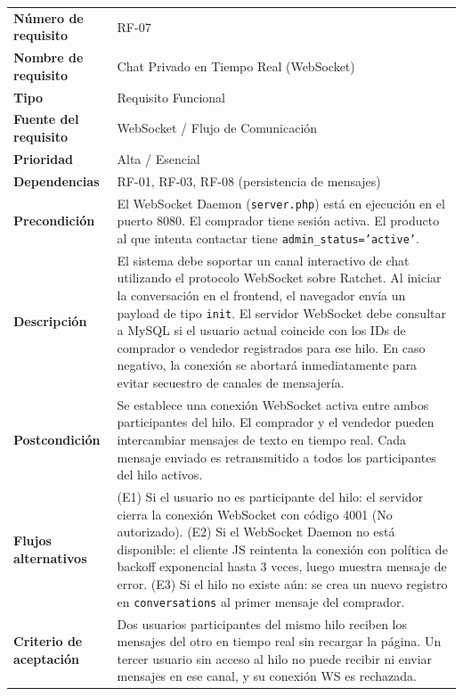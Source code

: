 \documentclass[11pt,a4paper]{report}
\begin{document}
\begin{table}[H]
\centering
\begin{tabularx}{\textwidth}{|l|L|}
\hline
{} \\ \hline
\textbf{Número de requisito} & RF-07 \\ \hline
\textbf{Nombre de requisito} & Chat Privado en Tiempo Real (WebSocket) \\ \hline
\textbf{Tipo} & Requisito Funcional \\ \hline
\textbf{Fuente del requisito} & WebSocket / Flujo de Comunicación \\ \hline
\textbf{Prioridad} & Alta / Esencial \\ \hline
\textbf{Dependencias} & RF-01, RF-03, RF-08 (persistencia de mensajes) \\ \hline
\textbf{Precondición} & El WebSocket Daemon (\texttt{server.php}) está en ejecución en el puerto 8080. El comprador tiene sesión activa. El producto al que intenta contactar tiene \texttt{admin\_status='active'}. \\ \hline
\textbf{Descripción} & El sistema debe soportar un canal interactivo de chat utilizando el protocolo WebSocket sobre Ratchet. Al iniciar la conversación en el frontend, el navegador envía un payload de tipo \texttt{init}. El servidor WebSocket debe consultar a MySQL si el usuario actual coincide con los IDs de comprador o vendedor registrados para ese hilo. En caso negativo, la conexión se abortará inmediatamente para evitar secuestro de canales de mensajería. \\ \hline
\textbf{Postcondición} & Se establece una conexión WebSocket activa entre ambos participantes del hilo. El comprador y el vendedor pueden intercambiar mensajes de texto en tiempo real. Cada mensaje enviado es retransmitido a todos los participantes del hilo activos. \\ \hline
\textbf{Flujos alternativos} & (E1) Si el usuario no es participante del hilo: el servidor cierra la conexión WebSocket con código 4001 (No autorizado). (E2) Si el WebSocket Daemon no está disponible: el cliente JS reintenta la conexión con política de backoff exponencial hasta 3 veces, luego muestra mensaje de error. (E3) Si el hilo no existe aún: se crea un nuevo registro en \texttt{conversations} al primer mensaje del comprador. \\ \hline
\textbf{Criterio de aceptación} & Dos usuarios participantes del mismo hilo reciben los mensajes del otro en tiempo real sin recargar la página. Un tercer usuario sin acceso al hilo no puede recibir ni enviar mensajes en ese canal, y su conexión WS es rechazada. \\ \hline
\end{tabularx}
\end{table}
\end{document}
